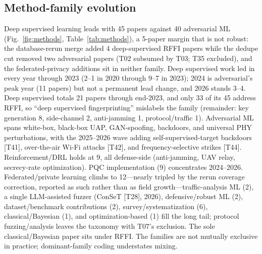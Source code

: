 \documentclass[11pt,a4paper]{article}
\begin{document}
\subsection{Method-family evolution}
Deep supervised learning leads with 45 papers against 40 adversarial ML (Fig.~\ref{fig:methods}, Table~\ref{tab:methods}), a 5-paper margin that is not robust: the database-rerun merge added 4 deep-supervised RFFI papers while the dedupe cut removed two adversarial papers (T02 subsumed by T03; T35 excluded), and the federated-privacy additions sit in neither family. Deep supervised work led in every year through 2023 (2--1 in 2020 through 9--7 in 2023); 2024 is adversarial's peak year (11 papers) but not a permanent lead change, and 2026 stands 3--4. Deep supervised totals 21 papers through end-2023, and only 33 of its 45 address RFFI, so ``deep supervised fingerprinting'' mislabels the family (remainder: key generation 8, side-channel 2, anti-jamming 1, protocol/traffic 1). Adversarial ML spans white-box, black-box UAP, GAN-spoofing, backdoors, and universal PHY perturbations, with the 2025--2026 wave adding self-supervised-target backdoors [T41], over-the-air Wi-Fi attacks [T42], and frequency-selective strikes [T44]. Reinforcement/DRL holds at 9, all defense-side (anti-jamming, UAV relay, secrecy-rate optimization). PQC implementation (9) concentrates 2024--2026. Federated/private learning climbs to 12---nearly tripled by the rerun coverage correction, reported as such rather than as field growth---traffic-analysis ML (2), a single LLM-assisted fuzzer (ConSeT [T28], 2026), defensive/robust ML (2), dataset/benchmark contributions (2), survey/systematization (6), classical/Bayesian (1), and optimization-based (1) fill the long tail; protocol fuzzing/analysis leaves the taxonomy with T07's exclusion. The sole classical/Bayesian paper sits under RFFI. The families are not mutually exclusive in practice; dominant-family coding understates mixing.
\end{document}
